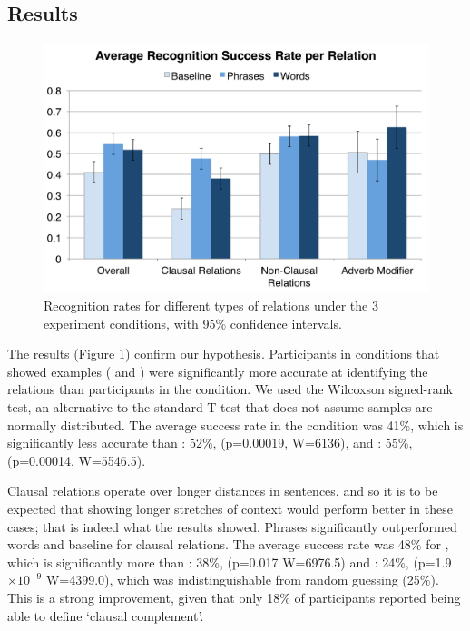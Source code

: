 \subsection{Results}
\begin{figure}
\centering
\includegraphics[width=\columnwidth]{fig/results}
\caption{\label{fig:results} Recognition rates for different types of relations under the 3 experiment conditions, with 95\% confidence intervals.}
\end{figure}

The results (Figure \ref{fig:results}) confirm our hypothesis. Participants in conditions that showed examples ( and ) were significantly more accurate at identifying the relations than participants in the  condition. We used the Wilcoxson signed-rank test, an alternative to the standard T-test that does not assume samples are normally distributed. The average success rate in the  condition was 41\%, which is significantly less accurate than : 52\%, (p=0.00019, W=6136), and : 55\%, (p=0.00014, W=5546.5).


Clausal relations operate over longer distances in sentences, and so it is to be expected that showing longer stretches of context would perform better in these cases; that is indeed what the results showed.
Phrases significantly outperformed words and baseline for clausal relations. The average success rate was 48\% for , which is significantly more than : 38\%, (p=0.017 W=6976.5) and : 24\%, (p=1.9$\times 10^{-9}$ W=4399.0), which was indistinguishable from random guessing (25\%). This is a  strong improvement, given that only 18\% of participants reported being able to define  `clausal complement'.

